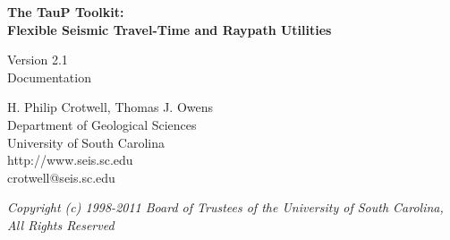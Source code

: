 
\begin{titlepage}
\begin{center}

\vspace{2in}

\LARGE
\textbf{
The TauP Toolkit: \\
Flexible Seismic Travel-Time and Raypath Utilities \\
}

\large
Version 2.1 \\
Documentation 

\vspace{3in}

H. Philip Crotwell, Thomas J. Owens \\
Department of Geological Sciences \\
University of South Carolina \\
http://www.seis.sc.edu \\
crotwell@seis.sc.edu 

\vspace{3in}

\textit{
\normalsize 
Copyright (c) 1998-2011 Board of Trustees of the University of South Carolina, \\
All Rights Reserved
\normalsize}

\end{center}
\end{titlepage}
